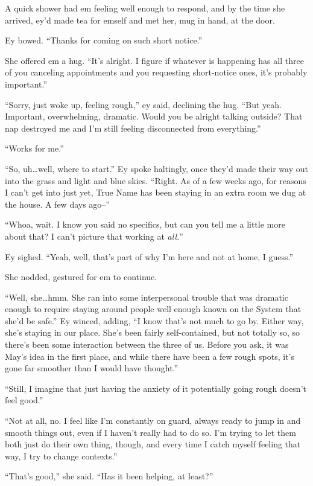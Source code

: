 A quick shower had em feeling well enough to respond, and by the time she arrived, ey'd made tea for emself and met her, mug in hand, at the door.

Ey bowed. ``Thanks for coming on such short notice.''

She offered em a hug. ``It's alright. I figure if whatever is happening has all three of you canceling appointments and you requesting short-notice ones, it's probably important.''

``Sorry, just woke up, feeling rough,'' ey said, declining the hug. ``But yeah. Important, overwhelming, dramatic. Would you be alright talking outside? That nap destroyed me and I'm still feeling disconnected from everything.''

``Works for me.''

``So, uh\ldots well, where to start.'' Ey spoke haltingly, once they'd made their way out into the grass and light and blue skies. ``Right. As of a few weeks ago, for reasons I can't get into just yet, True Name has been staying in an extra room we dug at the house. A few days ago--''

``Whoa, wait. I know you said no specifics, but can you tell me a little more about that? I can't picture that working at \emph{all.}''

Ey sighed. ``Yeah, well, that's part of why I'm here and not at home, I guess.''

She nodded, gestured for em to continue.

``Well, she\ldots hmm. She ran into some interpersonal trouble that was dramatic enough to require staying around people well enough known on the System that she'd be safe.'' Ey winced, adding, ``I know that's not much to go by. Either way, she's staying in our place. She's been fairly self-contained, but not totally so, so there's been some interaction between the three of us. Before you ask, it was May's idea in the first place, and while there have been a few rough spots, it's gone far smoother than I would have thought.''

``Still, I imagine that just having the anxiety of it potentially going rough doesn't feel good.''

``Not at all, no. I feel like I'm constantly on guard, always ready to jump in and smooth things out, even if I haven't really had to do so. I'm trying to let them both just do their own thing, though, and every time I catch myself feeling that way, I try to change contexts.''

``That's good,'' she said. ``Has it been helping, at least?''

